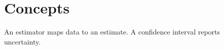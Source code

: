 \documentclass{article}
\begin{document}
\section{Concepts}
An estimator maps data to an estimate.
A confidence interval reports uncertainty.
\printindex
\end{document}
